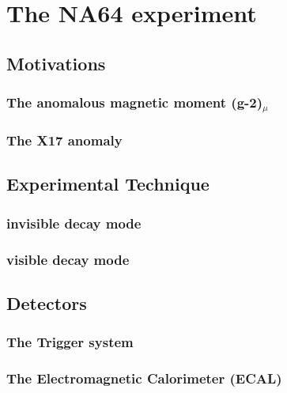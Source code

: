 
\chapter{The NA64 experiment} %

\label{chapter2} %



\section{Motivations}

\subsection{The anomalous magnetic moment (g-2)$_{\mu}$}

\subsection{The X17 anomaly}

\section{Experimental Technique}

\subsection{invisible decay mode}

\subsection{visible decay mode}

\section{Detectors}

\subsection{The Trigger system}

\subsection{The Electromagnetic Calorimeter (ECAL)}

